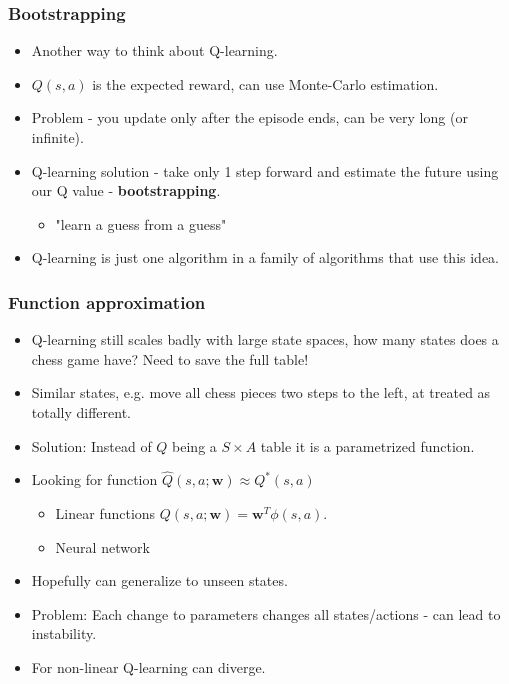 \documentclass{beamer}
\newcommand{\bw}{\mathbf{w}}
\renewcommand{\high}{\textbf}
\begin{document}
\begin{frame}\frametitle{Bootstrapping}\small
\begin{itemize}
    \item Another way to think about Q-learning.
    \item $Q(s,a)$ is the expected reward, can use Monte-Carlo estimation.
    \item Problem - you update only after the episode ends, can be very long (or infinite).
    \item Q-learning solution - take only 1 step forward and estimate the future using our Q value - \high{bootstrapping}.
    \begin{itemize}
        \item "learn a guess from a guess"
    \end{itemize} 
    \item Q-learning is just one algorithm in a family of algorithms that use this idea.
\end{itemize}
\end{frame}

\begin{frame}\frametitle{Function approximation}\small
\begin{itemize}
    \item Q-learning still scales badly with large state spaces, how many states does a chess game have? Need to save the full table!
    \item Similar states, e.g. move all chess pieces two steps to the left, at treated as totally different.
    \item Solution: Instead of $Q$ being a $S\times A$ table it is a parametrized function.
     \item Looking for function $\hat{Q}(s,a;\bw)\approx Q^*(s,a)$
    \begin{itemize}
        \item Linear functions $Q(s,a;\bw)=\bw^T\phi(s,a)$.
        \item Neural network
    \end{itemize}
    \item Hopefully can generalize to unseen states.
    \item Problem: Each change to parameters changes all states/actions - can lead to instability.
    \item For non-linear Q-learning can diverge.
\end{itemize}
\end{frame}
\end{document}
